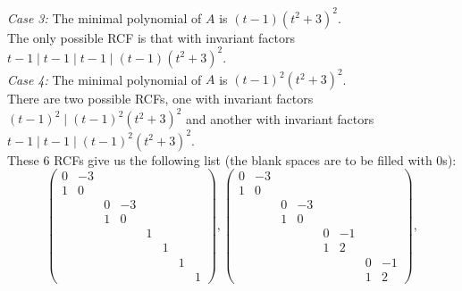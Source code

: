 \documentclass[12pt]{article}
\begin{document}
\noindent \textit{Case 3:} The minimal polynomial of $A$ is $(t - 1)(t^2 + 3)^2$. \\
The only possible RCF is that with invariant factors $t - 1 \mid t - 1 \mid t - 1 \mid (t - 1)(t^2 + 3)^2$. \\

\noindent \textit{Case 4:} The minimal polynomial of $A$ is $(t - 1)^2(t^2 + 3)^2$. \\
There are two possible RCFs, one with invariant factors $(t - 1)^2 \mid (t - 1)^2(t^2 + 3)^2$ and another with invariant factors $t - 1 \mid t - 1 \mid (t - 1)^2(t^2 + 3)^2$. \\

\noindent These $6$ RCFs give us the following list (the blank spaces are to be filled with $0$s): 
\[
    \begin{pmatrix}
        0 & -3 &  &  &  &  &  &  \\
        1 & 0 &  &  &  &  &  &  \\
         &  & 0 & -3 &  &  &  &  \\
         &  & 1 & 0 &  &  &  &  \\
         &  &  &  & 1 &  &  &  \\
         &  &  &  &  & 1 &  &  \\
         &  &  &  &  &  & 1 &  \\
         &  &  &  &  &  &  & 1 
    \end{pmatrix}, 
    \begin{pmatrix}
        0 & -3 &  &  &  &  &  &  \\
        1 & 0 &  &  &  &  &  &  \\
         &  & 0 & -3 &  &  &  &  \\
         &  & 1 & 0 &  &  &  &  \\
         &  &  &  & 0 & -1 &  &  \\
         &  &  &  & 1 & 2 &  &  \\
         &  &  &  &  &  & 0 & -1 \\
         &  &  &  &  &  & 1 & 2 
    \end{pmatrix},
\]
\end{document}
